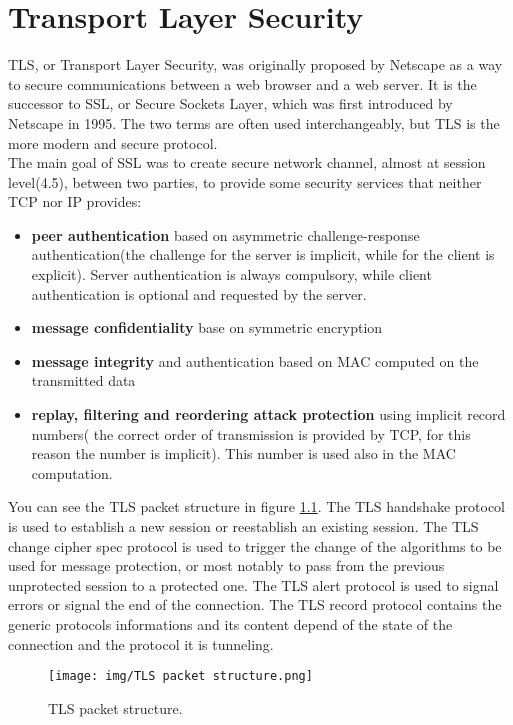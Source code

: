 \chapter{Transport Layer Security}
TLS, or Transport Layer Security, was originally proposed by Netscape
as a way to secure communications between a web browser and a
web server. It is the successor to SSL, or Secure Sockets Layer, which
was first introduced by Netscape in 1995. The two terms are often used
interchangeably, but TLS is the more modern and secure protocol.\\ 
The main goal of SSL was to create secure network channel, almost at
session level(4.5), between two parties, to provide some security
services that neither TCP nor IP provides:
\begin{itemize}
  \item \textbf{peer authentication} based on asymmetric
    challenge-response authentication(the challenge for the server is
    implicit, while for the client is explicit). Server authentication
    is always compulsory, while client authentication is optional and
    requested by the server.
  \item \textbf{message confidentiality} base on symmetric encryption
  \item \textbf{message integrity} and authentication based on MAC
    computed on the transmitted data
  \item \textbf{replay, filtering and reordering attack protection}
    using implicit record numbers( the correct order of transmission
    is provided by TCP, for this reason the number is implicit). This
    number is used also in the MAC computation.

\end{itemize}

You can see the TLS packet structure in figure
\ref{fig:tls-packet-structure}.
The TLS handshake protocol is used to establish a new session or 
reestablish an existing session. The TLS change cipher spec protocol 
is used to trigger the change of the algorithms to be used for message 
protection, or most notably to pass from the previous unprotected 
session to a protected one. The TLS alert protocol is used to signal
errors or signal the end of the connection. 
The TLS record protocol contains the generic protocols informations
and its content depend of the state of the connection and the protocol
it is tunneling.
\begin{figure}[H]
    \centering
    \texttt{[image: img/TLS packet
    structure.png]}
    \caption{TLS packet structure.}
    \label{fig:tls-packet-structure}
\end{figure}

